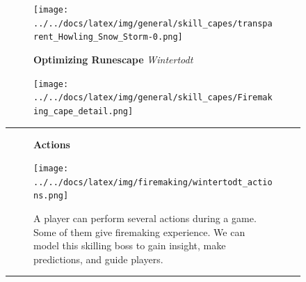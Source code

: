 \documentclass[]{article}
\newcommand{\lcol}{0.15}
\newcommand{\ccol}{0.55}
\newcommand{\rcol}{0.25}
\newcommand{\textsize}{\large}
\begin{document}
	\begin{figure}[b]
		\centering
		\begin{subfigure}{.2\linewidth}
		    \texttt{[image: ../../docs/latex/img/general/skill\_capes/transparent\_Howling\_Snow\_Storm-0.png]}
		\end{subfigure}%
		\begin{subfigure}{.6\linewidth}
			\centering
		    \Huge{\textbf{Optimizing Runescape}}
		    \vspace{5mm}
		    \huge{\textit{Wintertodt}}
		\end{subfigure}%
		\begin{subfigure}{.2\linewidth}
		    \texttt{[image: ../../docs/latex/img/general/skill\_capes/Firemaking\_cape\_detail.png]}
		    \vspace{5mm}
		\end{subfigure}

		\hrule
		\centering
		\begin{subfigure}{\lcol\linewidth}
		    \centering
		    \LARGE{\textbf{Actions}}
		\end{subfigure}%
		\begin{subfigure}{\ccol\linewidth}
		    \centering
		    \vspace{5mm}
		    \texttt{[image: ../../docs/latex/img/firemaking/wintertodt\_actions.png]}
		    \vspace{5mm}
		\end{subfigure}%
		\begin{subfigure}{\rcol\linewidth}
			\textsize
		    A player can perform several actions during a game. Some of them give firemaking experience. We can model this skilling boss to gain insight, make predictions, and guide players.
		\end{subfigure}

		\hrule


\end{figure}
\end{document}
